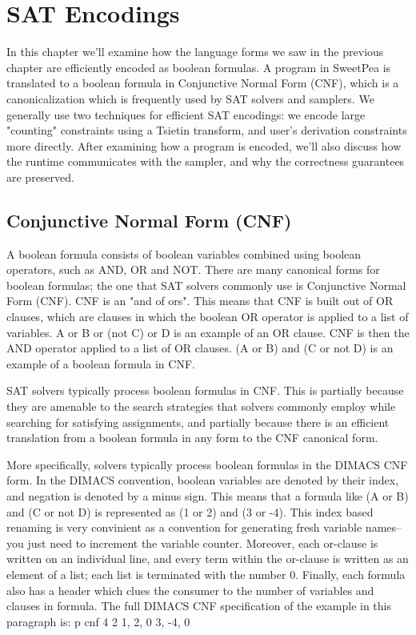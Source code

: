 
\chapter{SAT Encodings}

In this chapter we'll examine how the language forms we saw in the previous chapter are efficiently encoded as boolean formulas. A program in SweetPea is translated to a boolean formula in Conjunctive Normal Form (CNF), which is a canonicalization which is frequently used by SAT solvers and samplers. We generally use two techniques for efficient SAT encodings: we encode large "counting" constraints using a Tsietin transform, and user's derivation constraints more directly. After examining how a program is encoded, we'll also discuss how the runtime communicates with the sampler, and why the correctness guarantees are preserved.

\section{Conjunctive Normal Form (CNF)}

A boolean formula consists of boolean variables combined using boolean operators, such as AND, OR and NOT. There are many canonical forms for boolean formulas; the one that SAT solvers commonly use is Conjunctive Normal Form (CNF). CNF is an "and of ors". This means that CNF is built out of OR clauses, which are clauses in which the boolean OR operator is applied to a list of variables. A or B or (not C) or D is an example of an OR clause. CNF is then the AND operator applied to a list of OR clauses. (A or B) and (C or not D) is an example of a boolean formula in CNF.

SAT solvers typically process boolean formulas in CNF. This is partially because they are amenable to the search strategies that solvers commonly employ while searching for satisfying assignments, and partially because there is an efficient translation from a boolean formula in any form to the CNF canonical form.

More specifically, solvers typically process boolean formulas in the DIMACS CNF form. In the DIMACS convention, boolean variables are denoted by their index, and negation is denoted by a minus sign. This means that a formula like (A or B) and (C or not D) is represented as (1 or 2) and (3 or -4). This index based renaming is very convinient as a convention for generating fresh variable names-- you just need to increment the variable counter. Moreover, each or-clause is written on an individual line, and every term within the or-clause is written as an element of a list; each list is terminated with the number 0. Finally, each formula also has a header which clues the consumer to the number of variables and clauses in formula. The full DIMACS CNF specification of the example in this paragraph is:
p cnf 4 2
1, 2, 0
3, -4, 0

